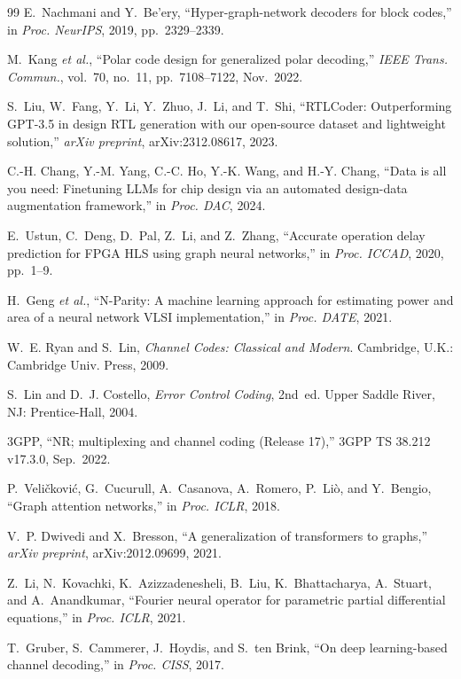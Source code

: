 \begin{thebibliography}{99}
E.~Nachmani and Y.~Be'ery,
``Hyper-graph-network decoders for block codes,''
in \textit{Proc. NeurIPS}, 2019, pp.~2329--2339.

M.~Kang \textit{et al.},
``Polar code design for generalized polar decoding,''
\textit{IEEE Trans. Commun.}, vol.~70, no.~11, pp.~7108--7122, Nov.~2022.

S.~Liu, W.~Fang, Y.~Li, Y.~Zhuo, J.~Li, and T.~Shi,
``RTLCoder: Outperforming GPT-3.5 in design RTL generation with our open-source
dataset and lightweight solution,''
\textit{arXiv preprint}, arXiv:2312.08617, 2023.

C.-H. Chang, Y.-M. Yang, C.-C. Ho, Y.-K. Wang, and H.-Y. Chang,
``Data is all you need: Finetuning LLMs for chip design via an automated design-data
augmentation framework,''
in \textit{Proc. DAC}, 2024.

E.~Ustun, C.~Deng, D.~Pal, Z.~Li, and Z.~Zhang,
``Accurate operation delay prediction for FPGA HLS using graph neural networks,''
in \textit{Proc. ICCAD}, 2020, pp.~1--9.

H.~Geng \textit{et al.},
``N-Parity: A machine learning approach for estimating power and area of a neural
network VLSI implementation,''
in \textit{Proc. DATE}, 2021.

W.~E. Ryan and S.~Lin,
\textit{Channel Codes: Classical and Modern}.
Cambridge, U.K.: Cambridge Univ. Press, 2009.

S.~Lin and D.~J. Costello,
\textit{Error Control Coding}, 2nd~ed.
Upper Saddle River, NJ: Prentice-Hall, 2004.

3GPP,
``NR; multiplexing and channel coding (Release 17),''
3GPP TS 38.212 v17.3.0, Sep.~2022.

P.~Veli\v{c}kovi\'{c}, G.~Cucurull, A.~Casanova, A.~Romero, P.~Li\`{o}, and Y.~Bengio,
``Graph attention networks,''
in \textit{Proc. ICLR}, 2018.

V.~P. Dwivedi and X.~Bresson,
``A generalization of transformers to graphs,''
\textit{arXiv preprint}, arXiv:2012.09699, 2021.

Z.~Li, N.~Kovachki, K.~Azizzadenesheli, B.~Liu, K.~Bhattacharya, A.~Stuart, and A.~Anandkumar,
``Fourier neural operator for parametric partial differential equations,''
in \textit{Proc. ICLR}, 2021.

T.~Gruber, S.~Cammerer, J.~Hoydis, and S.~ten Brink,
``On deep learning-based channel decoding,''
in \textit{Proc. CISS}, 2017.


\end{thebibliography}
